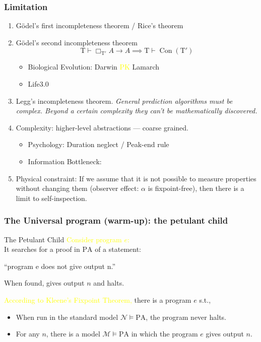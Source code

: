 \documentclass[UTF8,aspectratio=43,11pt,colorlinks,compress,openany]{beamer}%
\begin{document}
\begin{frame}\frametitle{Limitation}
\begin{enumerate}
	\item G\"odel's first incompleteness theorem / Rice's theorem
	\item G\"odel's second incompleteness theorem
	\[\mathrm{T}\vdash\Box_{\mathrm{T}'}A\to A\implies \mathrm{T}\vdash\operatorname{Con}(\mathrm{T}')\]
	\begin{itemize}
		\item Biological Evolution: Darwin \textcolor{yellow}{PK} Lamarch
		\item Life3.0
	\end{itemize}
	\item Legg's incompleteness theorem. \emph{General prediction algorithms must be complex. Beyond a certain complexity they can't be mathematically discovered.}
	\item Complexity: higher-level abstractions --- coarse grained.\\
	\begin{itemize}
		\item Psychology: Duration neglect / Peak-end rule
		\item Information Bottleneck: 
	\end{itemize}
	\item Physical constraint: If we assume that it is not possible to measure properties without changing them (observer effect: $\alpha$ is fixpoint-free), then there is a limit to self-inspection.
\end{enumerate}
\end{frame}

\begin{frame}\frametitle{The Universal program (warm-up): the petulant child}
\begin{block}{The Petulant Child}
\textcolor{yellow}{Consider program $e$:}\\
It searches for a proof in $\mathrm{PA}$ of a statement:\\
\centerline{``program e does not give output n.''}
When found, gives output $n$ and halts.
\end{block}
\begin{block}{}
\textcolor{yellow}{According to Kleene's Fixpoint Theorem,}
there is a program $e$ s.t.,
\begin{itemize}
	\item When run in the standard model $\mathcal{N}\vDash\mathrm{PA}$, the program never halts.
	\item For any $n$, there is a model $\mathcal{M}\vDash\mathrm{PA}$ in which the program $e$ gives output $n$.
\end{itemize}
\end{block}
\end{frame}
\end{document}
